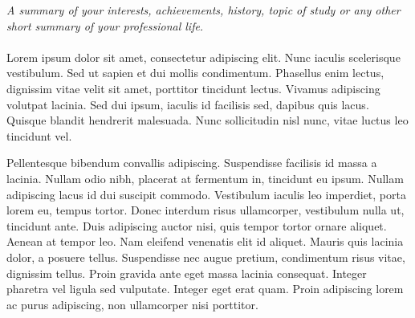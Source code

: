 

\vspace{-1.3em} %

\begin{multicols}{2}  %
\noindent \textit{A summary of your interests, achievements, history,
  topic of study or any other short summary of your professional
  life.}\\\\
Lorem ipsum dolor sit amet, consectetur adipiscing elit. Nunc iaculis
scelerisque vestibulum. Sed ut sapien et dui mollis
condimentum. Phasellus enim lectus, dignissim vitae velit sit amet,
porttitor tincidunt lectus. Vivamus adipiscing volutpat lacinia. Sed
dui ipsum, iaculis id facilisis sed, dapibus quis lacus. Quisque
blandit hendrerit malesuada. Nunc sollicitudin nisl nunc, vitae luctus
leo tincidunt vel.

Pellentesque bibendum convallis adipiscing. Suspendisse facilisis id
massa a lacinia. Nullam odio nibh, placerat at fermentum in, tincidunt
eu ipsum. Nullam adipiscing lacus id dui suscipit commodo. Vestibulum
iaculis leo imperdiet, porta lorem eu, tempus tortor. Donec interdum
risus ullamcorper, vestibulum nulla ut, tincidunt ante. Duis
adipiscing auctor nisi, quis tempor tortor ornare aliquet. Aenean at
tempor leo. Nam eleifend venenatis elit id aliquet. Mauris quis
lacinia dolor, a posuere tellus. Suspendisse nec augue pretium,
condimentum risus vitae, dignissim tellus. Proin gravida ante eget
massa lacinia consequat. Integer pharetra vel ligula sed
vulputate. Integer eget erat quam. Proin adipiscing lorem ac purus
adipiscing, non ullamcorper nisi porttitor. 
\end{multicols}

\spacedhrule{0.5em}{-0.4em} %
